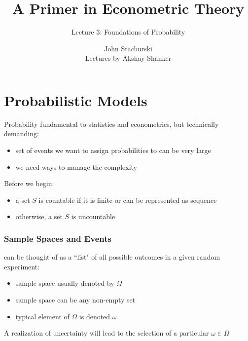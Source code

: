 






\title{A Primer in Econometric Theory}

\subtitle
{Lecture 3: Foundations of Probability}

\author{John Stachurski \\ \tiny Lectures by Akshay Shanker}






\begin{frame}
  \titlepage
\end{frame}

\section{Probabilistic Models}

\begin{frame}

    \vspace{2em}
    Probability fundamental to statistics and econometrics, but technically demanding:
    
    \begin{itemize}
        \item set of events we want to assign probabilities to can be very large 
        \item we need ways to manage the complexity 
    \end{itemize}
    
    \vspace{1em}
    Before we begin:
    \begin{itemize}
        \item a set $S$ is countable if it is finite or can be represented as sequence 
        \item otherwise, a set $S$ is uncountable
    \end{itemize}

\end{frame}

\begin{frame}\frametitle{Sample Spaces and Events}

    \vspace{2em}
     can be thought of as a ``list" of
    all possible outcomes in a given random experiment:
    \begin{itemize}
        \item sample space usually denoted by $\Omega$
        \item sample space can be any non-empty set
        \item typical element of $\Omega$ is denoted $\omega$
   \end{itemize}
   
    \vspace{1em}
    A realization of uncertainty will lead to the selection of
    a particular $\omega\in \Omega$
    
\end{frame}


